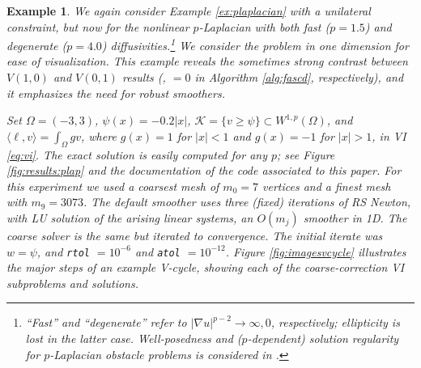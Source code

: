 \documentclass[letterpaper,final,12pt,reqno]{amsart}
\theoremstyle{cstyle}
\theoremstyle{cstyle*}
\theoremstyle{dstyle}
\newtheorem{example}[theorem]{Example}
\numberwithin{equation}{section}
\numberwithin{figure}{section}
\numberwithin{table}{section}
\numberwithin{theorem}{section}
\newcommand{\grad}{\nabla}
\newcommand{\ip}[2]{\langle#1,#2\rangle}
\begin{document}
\begin{example}  \label{ex:results:plap}
We again consider Example \ref{ex:plaplacian} with a unilateral constraint, but now for the nonlinear $p$-Laplacian with both fast ($p=1.5$) and degenerate ($p=4.0$) diffusivities.\footnote{``Fast'' and ``degenerate'' refer to $|\grad u|^{p-2}\to \infty,0$, respectively; ellipticity is lost in the latter case.  Well-posedness and ($p$-dependent) solution regularity for $p$-Laplacian obstacle problems is considered in \cite{ChoeLewis1991}.} We consider the problem in one dimension for ease of visualization. This example reveals the sometimes strong contrast between $V(1,0)$ and $V(0,1)$ results (,  $=0$ in Algorithm \ref{alg:fascd}, respectively), and it emphasizes the need for robust smoothers.

Set $\Omega=(-3,3)$, $\psi(x) = -0.2|x|$, $\mathcal{K} = \{v \ge \psi\} \subset W^{1,p}(\Omega)$, and $\ip\ell v = \int_\Omega g v$, where $g(x)=1$ for $|x|<1$ and $g(x)=-1$ for $|x|>1$, in VI \eqref{eq:vi}.  The exact solution is easily computed for any $p$; see Figure \ref{fig:results:plap} and the documentation of the code associated to this paper.  For this experiment we used a coarsest mesh of $m_0=7$ vertices and a finest mesh with $m_9=3073$.  The default smoother uses three (fixed) iterations of RS Newton, with LU solution of the arising linear systems, an $O(m_j)$ smoother in 1D.  The coarse solver is the same but iterated to convergence.  The initial iterate was $w=\psi$, and \texttt{rtol} $= 10^{-6}$ and \texttt{atol} $= 10^{-12}$.  Figure \ref{fig:imagesvcycle} illustrates the major steps of an example V-cycle, showing each of the coarse-correction VI subproblems and solutions.


\end{example}
\end{document}
